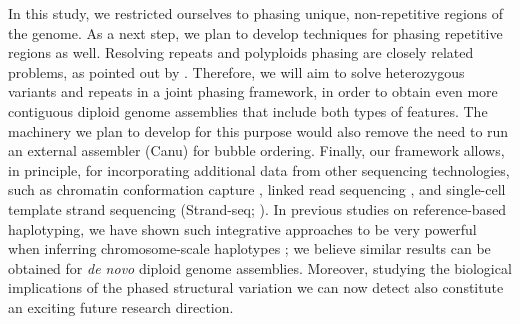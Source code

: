 In this study, we restricted ourselves to phasing unique, non-repetitive regions of the genome.
As a next step, we plan to develop techniques for phasing repetitive regions as well.
Resolving repeats and polyploids phasing are closely related problems, as pointed out by \cite{Chaisson2017}.
Therefore, we will aim to solve heterozygous variants and repeats in a joint phasing framework, in order to obtain even more contiguous diploid genome assemblies that include both types of features.
The machinery we plan to develop for this purpose would also remove the need to run an external assembler (Canu) for bubble ordering.
Finally, our framework allows, in principle, for incorporating additional data from other sequencing technologies, such as chromatin conformation capture \citep{burton2013chromosome}, linked read sequencing \citep{weisenfeld2017direct}, and single-cell template strand sequencing (Strand-seq; \citealp{Porubsky2016}).
In previous studies on reference-based haplotyping, we have shown such integrative approaches to be very powerful when inferring chromosome-scale haplotypes \citep{porubsky2017dense,chaisson2017multi}; we believe similar results can be obtained for \textit{de novo} diploid genome assemblies.
Moreover, studying the biological implications of the phased structural variation we can now detect also constitute an exciting future research direction.

